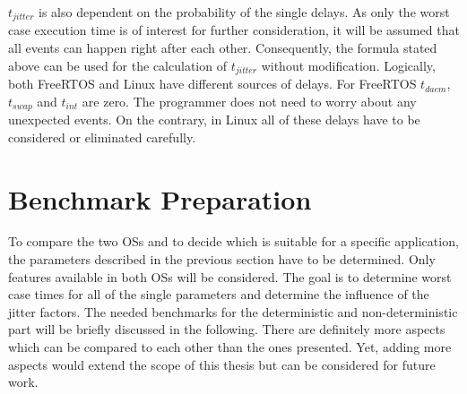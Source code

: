 $ t_{jitter} $ is also dependent on the probability of the single delays.
As only the worst case execution time is of interest for further consideration, it will be assumed that all events can happen right after each other.
Consequently, the formula stated above can be used for the calculation of $ t_{jitter} $ without modification.    
Logically, both FreeRTOS and Linux have different sources of delays. 
For FreeRTOS $ t_{daem} $, $ t_{swap} $ and $ t_{int} $ are zero. 
The programmer does not need to worry about any unexpected events.
On the contrary, in Linux all of these delays have to be considered or eliminated carefully.

\section{Benchmark Preparation}
To compare the two \acp{OS} and to decide which is suitable for a specific application, the parameters described in the previous section have to be determined.
Only features available in both \acp{OS} will be considered.
The goal is to determine worst case times for all of the single parameters and determine the influence of the jitter factors.
The needed benchmarks for the deterministic and non-deterministic part will be briefly discussed in the following.
There are definitely more aspects which can be compared to each other than the ones presented. 
Yet, adding more aspects would extend the scope of this thesis but can be considered for future work.
 
